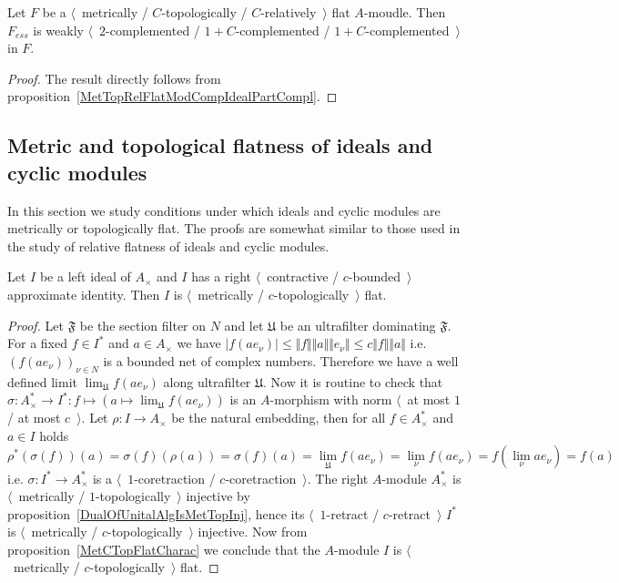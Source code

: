 \begin{corollary}\label{MetTopRelFlatModPartCompl} Let $F$ 
be a $\langle$~metrically / $C$-topologically / $C$-relatively~$\rangle$ 
flat $A$-moudle. Then $F_{ess}$ 
is weakly $\langle$~$2$-complemented / $1+C$-complemented / 
$1+C$-complemented~$\rangle$ in $F$.
\end{corollary}
\begin{proof} The result directly follows from 
proposition~\ref{MetTopRelFlatModCompIdealPartCompl}.
\end{proof}


\subsection{
    Metric and topological flatness of ideals and cyclic modules
}\label{SubSectionMetricAndTopologicalFlatnessOfIdealsAndCyclicModules}

In this section we study conditions under which ideals and cyclic modules are
metrically or topologically flat. The proofs are somewhat similar to those used
in the study of relative flatness of ideals and cyclic modules.

\begin{proposition}\label{MetTopFlatIdealsInUnitalAlg} Let $I$ be a left ideal
of $A_\times $ and $I$ has a right $\langle$~contractive / $c$-bounded~$\rangle$
approximate identity. Then $I$ is $\langle$~metrically /
$c$-topologically~$\rangle$ flat.
\end{proposition}
\begin{proof} Let $\mathfrak{F}$ be the section filter on $N$ and let
$\mathfrak{U}$ be an ultrafilter dominating $\mathfrak{F}$. 
For a fixed $f\in I^*$ 
and $a\in A_\times $ we have 
$|f(a e_\nu)|
\leq\Vert f\Vert\Vert a\Vert\Vert e_\nu\Vert
\leq c\Vert f\Vert\Vert a\Vert$ 
i.e. ${(f(ae_\nu))}_{\nu\in N}$ is a bounded net of complex numbers. 
Therefore we have a well defined limit $\lim_{\mathfrak{U}}f(ae_\nu)$ along 
ultrafilter $\mathfrak{U}$. Now it is routine to check that 
$\sigma:A_\times ^*\to I^*:f\mapsto (a\mapsto \lim_{\mathfrak{U}}f(ae_\nu))$ 
is an $A$-morphism with norm $\langle$~at most $1$ / at most $c$~$\rangle$. 
Let $\rho:I\to A_\times$ be the natural embedding, then for 
all $f\in A_\times^*$ and $a\in I$ holds
$$
\rho^*(\sigma(f))(a)
=\sigma(f)(\rho(a))
=\sigma(f)(a)
=\lim_{\mathfrak{U}}f(a e_\nu)
=\lim_{\nu}f(a e_\nu)
=f(\lim_{\nu}a e_\nu)
=f(a)
$$
i.e. $\sigma:I^*\to A_\times^*$ is a $\langle$~$1$-coretraction /
$c$-coretraction~$\rangle$. The right $A$-module $A_\times ^*$ is
$\langle$~metrically / $1$-topologically~$\rangle$ injective by
proposition~\ref{DualOfUnitalAlgIsMetTopInj}, hence its $\langle$~$1$-retract /
$c$-retract~$\rangle$ $I^*$ is $\langle$~metrically /
$c$-topologically~$\rangle$ injective. Now from 
proposition~\ref{MetCTopFlatCharac} we conclude that the $A$-module $I$ 
is $\langle$~metrically / $c$-topologically~$\rangle$ flat.
\end{proof}

